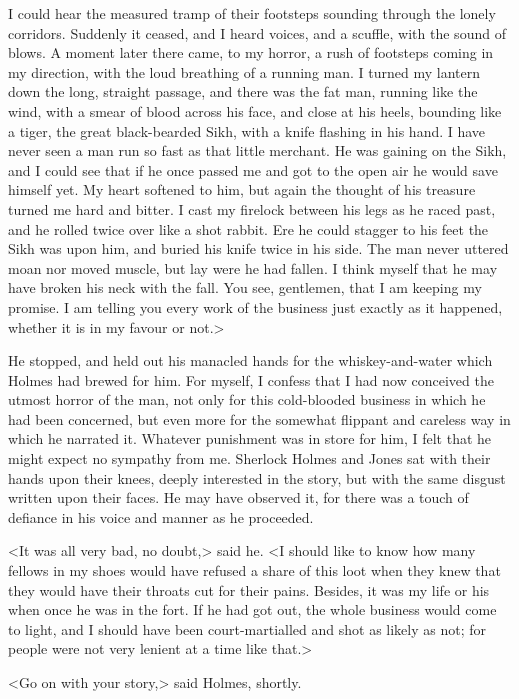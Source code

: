 I could hear the measured tramp of their footsteps sounding through the lonely corridors. Suddenly it ceased, and I heard voices, and a scuffle, with the sound of blows. A moment later there came, to my horror, a rush of footsteps coming in my direction, with the loud breathing of a running man. I turned my lantern down the long, straight passage, and there was the fat man, running like the wind, with a smear of blood across his face, and close at his heels, bounding like a tiger, the great black-bearded Sikh, with a knife flashing in his hand. I have never seen a man run so fast as that little merchant. He was gaining on the Sikh, and I could see that if he once passed me and got to the open air he would save himself yet. My heart softened to him, but again the thought of his treasure turned me hard and bitter. I cast my firelock between his legs as he raced past, and he rolled twice over like a shot rabbit. Ere he could stagger to his feet the Sikh was upon him, and buried his knife twice in his side. The man never uttered moan nor moved muscle, but lay were he had fallen. I think myself that he may have broken his neck with the fall. You see, gentlemen, that I am keeping my promise. I am telling you every work of the business just exactly as it happened, whether it is in my favour or not.>

He stopped, and held out his manacled hands for the whiskey-and-water which Holmes had brewed for him. For myself, I confess that I had now conceived the utmost horror of the man, not only for this cold-blooded business in which he had been concerned, but even more for the somewhat flippant and careless way in which he narrated it. Whatever punishment was in store for him, I felt that he might expect no sympathy from me. Sherlock Holmes and Jones sat with their hands upon their knees, deeply interested in the story, but with the same disgust written upon their faces. He may have observed it, for there was a touch of defiance in his voice and manner as he proceeded.

<It was all very bad, no doubt,> said he. <I should like to know how many fellows in my shoes would have refused a share of this loot when they knew that they would have their throats cut for their pains. Besides, it was my life or his when once he was in the fort. If he had got out, the whole business would come to light, and I should have been court-martialled and shot as likely as not; for people were not very lenient at a time like that.>

<Go on with your story,> said Holmes, shortly.

